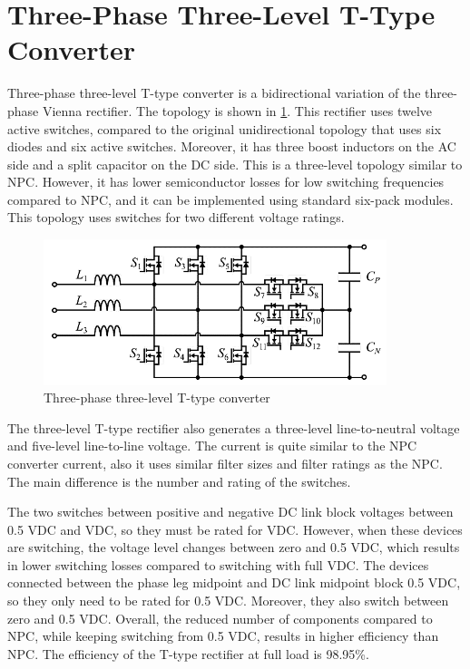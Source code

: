 \documentclass[12pt,a4paper]{book}
\begin{document}
\section{Three-Phase Three-Level T-Type Converter}
Three-phase three-level T-type converter is a bidirectional variation of the three-phase Vienna rectifier. The topology is shown in \ref{fig:image7}. This rectifier uses twelve active switches, compared to the original unidirectional topology that uses six diodes and six active switches. Moreover, it has three boost inductors on the AC side and a split capacitor on the DC side. This is a three-level topology similar to NPC. However, it has lower semiconductor losses for low switching frequencies compared to NPC, and it can be implemented using standard six-pack modules. This topology uses switches for two different voltage ratings.
\begin{figure}[h]
  \centering
  \includegraphics[width=10cm]{image7.png}
  \caption{Three-phase three-level T-type converter}
  \label{fig:image7}
\end{figure}

The three-level T-type rectifier also generates a three-level line-to-neutral voltage and five-level line-to-line voltage. The current is quite similar to the NPC converter current, also it uses similar filter sizes and filter ratings as the NPC. The main difference is the number and rating of the switches. 

The two switches between positive and negative DC link block voltages between 0.5 VDC and VDC, so they must be rated for VDC. However, when these devices are switching, the voltage level changes between zero and 0.5 VDC, which results in lower switching losses compared to switching with full VDC. The devices connected between the phase leg midpoint and DC link midpoint block 0.5 VDC, so they only need to be rated for 0.5 VDC. Moreover, they also switch between zero and 0.5 VDC. Overall, the reduced number of components compared to NPC, while keeping switching from 0.5 VDC, results in higher efficiency than NPC. The efficiency of the T-type rectifier at full load is 98.95\%.
\end{document}
